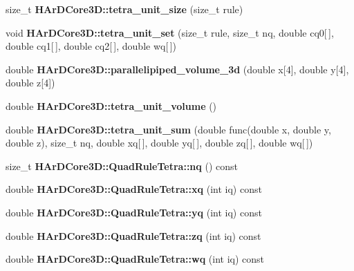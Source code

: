 \begin{DoxyCompactItemize}
\item 
\mbox{\label{group__Quadratures_ga2959cdcee47b26f7661359afc848098f}} 
size\+\_\+t {\bfseries H\+Ar\+D\+Core3\+D\+::tetra\+\_\+unit\+\_\+size} (size\+\_\+t rule)
\item 
\mbox{\label{group__Quadratures_ga49d3a11aa2d74a16bfda192b67d69f3d}} 
void {\bfseries H\+Ar\+D\+Core3\+D\+::tetra\+\_\+unit\+\_\+set} (size\+\_\+t rule, size\+\_\+t nq, double cq0\mbox{[}$\,$\mbox{]}, double cq1\mbox{[}$\,$\mbox{]}, double cq2\mbox{[}$\,$\mbox{]}, double wq\mbox{[}$\,$\mbox{]})
\item 
\mbox{\label{group__Quadratures_ga36434a8319a40c91a5deafaa2c38f6f3}} 
double {\bfseries H\+Ar\+D\+Core3\+D\+::parallelipiped\+\_\+volume\+\_\+3d} (double x\mbox{[}4\mbox{]}, double y\mbox{[}4\mbox{]}, double z\mbox{[}4\mbox{]})
\item 
\mbox{\label{group__Quadratures_gaf3ff72076364ccf402a9de3040cae812}} 
double {\bfseries H\+Ar\+D\+Core3\+D\+::tetra\+\_\+unit\+\_\+volume} ()
\item 
\mbox{\label{group__Quadratures_ga59fc38494b2b1789e1b5e3db3329646c}} 
double {\bfseries H\+Ar\+D\+Core3\+D\+::tetra\+\_\+unit\+\_\+sum} (double func(double x, double y, double z), size\+\_\+t nq, double xq\mbox{[}$\,$\mbox{]}, double yq\mbox{[}$\,$\mbox{]}, double zq\mbox{[}$\,$\mbox{]}, double wq\mbox{[}$\,$\mbox{]})
\item 
\mbox{\label{group__Quadratures_gab736fa08c7510bf06428c7ee938e0c7c}} 
size\+\_\+t {\bfseries H\+Ar\+D\+Core3\+D\+::\+Quad\+Rule\+Tetra\+::nq} () const
\item 
\mbox{\label{group__Quadratures_gac7d6d0fcc8f63e38967d020d9023ad62}} 
double {\bfseries H\+Ar\+D\+Core3\+D\+::\+Quad\+Rule\+Tetra\+::xq} (int iq) const
\item 
\mbox{\label{group__Quadratures_ga0dffade47ba012f57c7ca552570e2119}} 
double {\bfseries H\+Ar\+D\+Core3\+D\+::\+Quad\+Rule\+Tetra\+::yq} (int iq) const
\item 
\mbox{\label{group__Quadratures_ga4693da35cc21331c2737c08b8166c54c}} 
double {\bfseries H\+Ar\+D\+Core3\+D\+::\+Quad\+Rule\+Tetra\+::zq} (int iq) const
\item 
\mbox{\label{group__Quadratures_gae38100dd53fe45b8a3d263458b0ffc95}} 
double {\bfseries H\+Ar\+D\+Core3\+D\+::\+Quad\+Rule\+Tetra\+::wq} (int iq) const
\end{DoxyCompactItemize}

